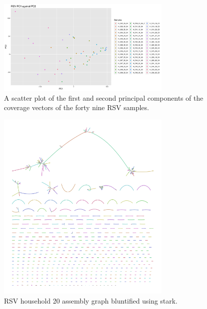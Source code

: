 \documentclass[10pt, a4paper]{article}
\begin{document}
\begin{figure}[h]
\centering
\includegraphics[width=0.75\textwidth]{../Figures/RSV/PCA.png}
\caption[RSV PCA]{\label{fig:orga05c68e}A scatter plot of the first and second principal components of the coverage vectors of the forty nine RSV samples.}
\end{figure}


\begin{figure}[h]
\centering
\includegraphics[width=0.75\textwidth]{../Figures/RSV/Assembly_Bluntified.png}
\caption[Bluntified RSV Assembly Graph]{\label{fig:org7366b45}RSV household 20 assembly graph bluntified using stark.}
\end{figure}
\end{document}
